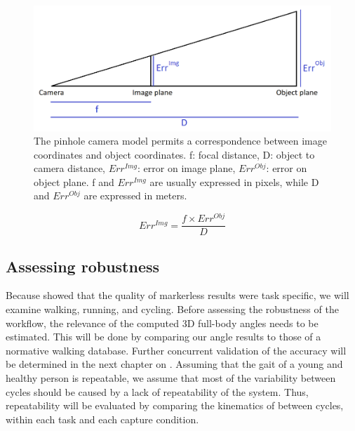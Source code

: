\begin{figure}[!ht]
	\centering
	\def\svgwidth{1\columnwidth}
	\fontsize{10pt}{10pt}\selectfont
	\includegraphics[width=\linewidth]{"../Chap4/Figures/Fig_PixelMeterCorrespondance.png"}
	\caption{The pinhole camera model permits a correspondence between image coordinates and object coordinates. f: focal distance, D: object to camera distance, $Err^{Img}$: error on image plane, $Err^{Obj}$: error on object plane. f and $Err^{Img}$ are usually expressed in pixels, while D and $Err^{Obj}$ are expressed in meters.}
	\label{fig_pixmeterscorrespondance}
\end{figure}

\begin{equation}
      Err^{Img} = \frac{f \times Err^{Obj}}{D} 
      \label{eqn:errobjimg}
\end{equation}


\subsection{Assessing robustness}

Because \cite{Needham2021a} showed that the quality of markerless results were task specific, we will examine walking, running, and cycling. Before assessing the robustness of the workflow, the relevance of the computed 3D full-body angles needs to be estimated. This will be done by comparing our angle results to those of a normative walking database. Further concurrent validation of the accuracy will be determined in the next chapter on . Assuming that the gait of a young and healthy person is repeatable, we assume that most of the variability between cycles should be caused by a lack of repeatability of the system. Thus, repeatability will be evaluated by comparing the kinematics of between cycles, within each task and each capture condition. 

